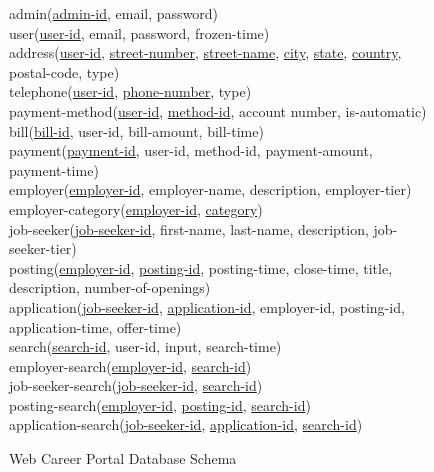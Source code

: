 \documentclass{article}
\begin{document}
        \begin{figure}[h]
            \begin{em}
                admin(\underline{admin-id}, email, password) \\
                user(\underline{user-id}, email, password, frozen-time) \\
                address(\underline{user-id}, \underline{street-number}, \underline{street-name}, \underline{city},
                \underline{state}, \underline{country}, postal-code, type) \\
                telephone(\underline{user-id}, \underline{phone-number}, type) \\
                payment-method(\underline{user-id}, \underline{method-id}, account number, is-automatic) \\
                bill(\underline{bill-id}, user-id, bill-amount, bill-time) \\
                payment(\underline{payment-id}, user-id, method-id, payment-amount, payment-time) \\
                employer(\underline{employer-id}, employer-name, description, employer-tier) \\
                employer-category(\underline{employer-id}, \underline{category}) \\
                job-seeker(\underline{job-seeker-id}, first-name, last-name, description, job-seeker-tier) \\
                posting(\underline{employer-id}, \underline{posting-id}, posting-time, close-time, title, description,
                number-of-openings) \\
                application(\underline{job-seeker-id}, \underline{application-id}, employer-id, posting-id,
                application-time, offer-time) \\
                search(\underline{search-id}, user-id, input, search-time) \\
                employer-search(\underline{employer-id}, \underline{search-id}) \\
                job-seeker-search(\underline{job-seeker-id}, \underline{search-id}) \\
                posting-search(\underline{employer-id}, \underline{posting-id}, \underline{search-id}) \\
                application-search(\underline{job-seeker-id}, \underline{application-id}, \underline{search-id})
            \end{em}
            \caption{Web Career Portal Database Schema}
            \label{fig:schema}
        \end{figure}
\end{document}
